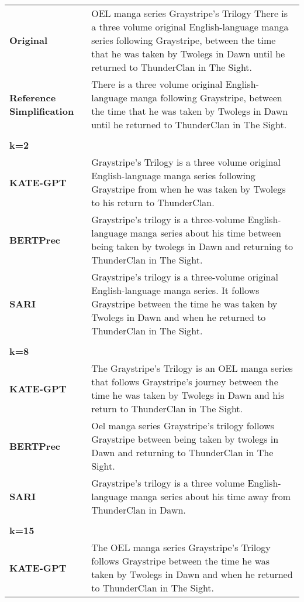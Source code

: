 \documentclass[11pt]{article}
\begin{document}
\begin{table*}[t]
\centering \small
\renewcommand{\arraystretch}{2}
\begin{tabular}{@{}lp{}@{}}
\toprule
{\bf Original}    & OEL manga series Graystripe's Trilogy There is a three volume original English-language manga series following Graystripe, between the time that he was taken by Twolegs in Dawn until he returned to ThunderClan in The Sight.\\
{\bf Reference Simplification}      & There is a three volume \textcolor{Mycolor3}{original English-language} manga following Graystripe, between the time that he was taken by Twolegs in Dawn until he returned to ThunderClan in The Sight.\\
\hline
 \\
\midrule
{\bf k=2}    &  \\
{\bf KATE-GPT}      & Graystripe's Trilogy is a three volume \textcolor{Mycolor3}{original English-language} manga series following Graystripe from when he was taken by Twolegs to his return to ThunderClan.\\
\hline
{\bf BERTPrec}      & Graystripe's trilogy is a three-volume \textcolor{Mycolor3}{English-language} manga series about his time between being taken by twolegs in Dawn and returning to ThunderClan in The Sight.\\
\hline
{\bf SARI}      & Graystripe's trilogy is a three-volume \textcolor{Mycolor3}{original English-language} manga series. It follows Graystripe between the time he was taken by Twolegs in Dawn and when he returned to ThunderClan in The Sight.
\\
\hline
 \\
\midrule
{\bf k=8}    &  \\
{\bf KATE-GPT}      & The Graystripe's Trilogy is an OEL manga series that follows Graystripe's journey between the time he was taken by Twolegs in Dawn and his return to ThunderClan in The Sight.
\\
\hline
{\bf BERTPrec}      & Oel manga series Graystripe's trilogy follows Graystripe between being taken by twolegs in Dawn and returning to ThunderClan in The Sight. \\
\hline
{\bf SARI}      & Graystripe's trilogy is a three volume \textcolor{Mycolor3}{English-language} manga series about his time away from ThunderClan in Dawn. \\
\hline
 \\
\midrule
{\bf k=15}    &  \\
{\bf KATE-GPT}      & The OEL manga series Graystripe's Trilogy follows Graystripe between the time he was taken by Twolegs in Dawn and when he returned to ThunderClan in The Sight.\\

\end{tabular}
\end{table*}
\end{document}
